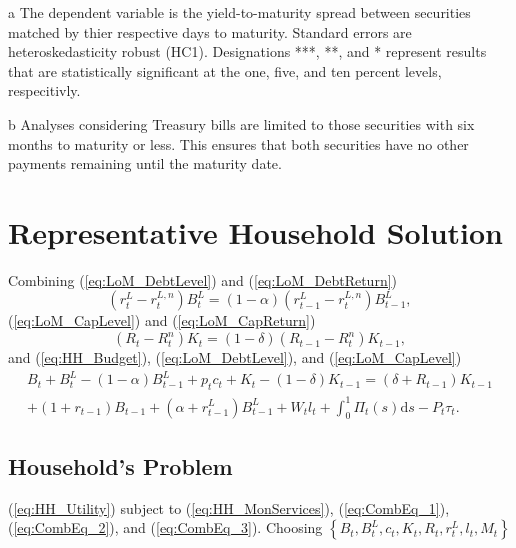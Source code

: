 \documentclass[11pt,a4paper,margin=1.5in]{article}
\begin{document}
\begin{table}[h]
\begin{threeparttable}
\begin{tabular}{l d{2.4} d{2.4} d{2.4}}
		\end{tabular}
		\begin{tablenotes}
			\item[a] \footnotesize{The dependent variable is the yield-to-maturity spread between securities matched by thier respective days to maturity. Standard errors are heteroskedasticity robust (HC1). Designations ***, **, and * represent results that are statistically significant at the one, five, and ten percent levels, respecitivly.}
			\item[b] \footnotesize{Analyses considering Treasury bills are limited to those securities with six months to maturity or less. This ensures that both securities have no other payments remaining until the maturity date.}
		\end{tablenotes}
	\end{threeparttable}
\end{table}


\section{Representative Household Solution}
\label{app:HH_Solution}

Combining (\ref{eq:LoM_DebtLevel}) and (\ref{eq:LoM_DebtReturn})
\begin{equation}
	\left(r^L_t-r^{L,n}_t\right)B^L_t = (1-\alpha)\left(r^L_{t-1}-r^{L,n}_t\right)B^L_{t-1},
	\label{eq:CombEq_1}
\end{equation}
(\ref{eq:LoM_CapLevel}) and (\ref{eq:LoM_CapReturn})
\begin{equation}
	\left(R_t-R^{n}_t\right)K_t = (1-\delta)\left(R_{t-1}-R^{n}_t\right)K_{t-1},
	\label{eq:CombEq_2}
\end{equation}
and (\ref{eq:HH_Budget}), (\ref{eq:LoM_DebtLevel}), and (\ref{eq:LoM_CapLevel})
\begin{multline}
	B_t + B^{L}_t - (1-\alpha)B^L_{t-1} + p_tc_t + K_t - (1-\delta)K_{t-1} = (\delta + R_{t-1})K_{t-1} \\+ (1+r_{t-1})B_{t-1} + (\alpha + r^L_{t-1})B^L_{t-1} + W_tl_t + \int^1_0\Pi_t(s)\text{d}s - P_t\tau_t.
	\label{eq:CombEq_3}
\end{multline}

\subsection{Household's Problem}
(\ref{eq:HH_Utility}) subject to (\ref{eq:HH_MonServices}), (\ref{eq:CombEq_1}), (\ref{eq:CombEq_2}), and (\ref{eq:CombEq_3}). Choosing 
$\left\{B_t, B^L_t, c_t, K_t, R_t, r^L_t, l_t, M_t\right\}$
\end{document}
